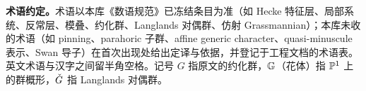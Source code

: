 \documentclass[UTF8,a4paper,12pt,fontset=fandol,scheme=chinese]{ctexart}
\begin{document}
\textbf{术语约定。}术语以本库《数语规范》已冻结条目为准（如 Hecke 特征层、局部系统、反常层、模叠、约化群、Langlands 对偶群、仿射 Grassmannian）；本库未收的术语（如 pinning、parahoric 子群、affine generic character、quasi-minuscule 表示、Swan 导子）在首次出现处给出定译与依据，并登记于工程文档的术语表。英文术语与汉字之间留半角空格。记号 $G$ 指原文的约化群，$\mathbb{G}$（花体）指 $\mathbb{P}^1$ 上的群概形，$\check G$ 指 Langlands 对偶群。

\newpage
\tableofcontents
\newpage
















\end{document}
